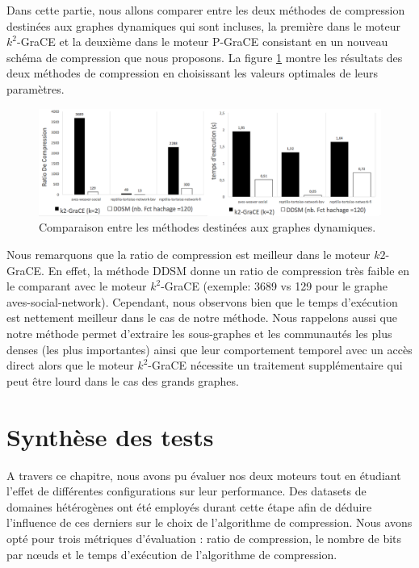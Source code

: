 	Dans cette partie, nous allons comparer entre les deux méthodes de compression destinées aux graphes dynamiques qui sont incluses, la première dans le moteur $k^2$-GraCE et la deuxième dans le moteur P-GraCE consistant en un nouveau schéma de compression que nous proposons. La figure \ref{fig:comp-dyn} montre les résultats des deux méthodes de compression en choisissant les valeurs optimales de leurs paramètres.
	
	\begin{figure}[H]
		\begin{center}
		 \includegraphics[scale=0.4]{ressources/image/dynComp.png}
			
			
			\caption{Comparaison entre les méthodes destinées aux graphes dynamiques.}
			\label{fig:comp-dyn}
		\end{center}
	\end{figure}
	
	
	Nous remarquons que la ratio de compression est meilleur dans le moteur $k2$-GraCE. En effet, la méthode DDSM donne un ratio de compression très faible en le comparant avec le moteur $k^2$-GraCE (exemple: 3689 vs 129 pour le graphe aves-social-network). Cependant, nous observons bien que le temps d'exécution est nettement meilleur dans le cas de notre méthode. Nous rappelons aussi que notre méthode permet d'extraire les sous-graphes et les communautés les plus denses (les plus importantes) ainsi que leur comportement temporel avec un accès direct alors que le moteur $k^2$-GraCE nécessite un traitement supplémentaire qui peut être lourd dans le cas des grands graphes. 
	
	 
	
	\section{Synthèse des tests}
	
	A travers ce chapitre,  nous avons pu évaluer nos deux moteurs tout en étudiant l'effet de différentes configurations sur leur performance. Des datasets de domaines hétérogènes ont été employés durant cette étape afin de déduire l'influence de ces derniers sur le choix de l'algorithme de compression. Nous avons opté pour trois métriques d'évaluation : ratio de compression, le nombre de bits par nœuds et le temps d'exécution de l'algorithme de compression.
	
